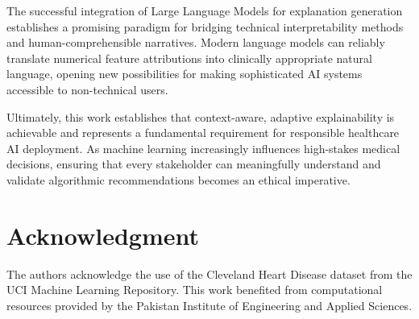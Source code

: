 \documentclass{ieeeaccess}
\begin{document}
The successful integration of Large Language Models for explanation generation establishes a promising paradigm for bridging technical interpretability methods and human-comprehensible narratives. Modern language models can reliably translate numerical feature attributions into clinically appropriate natural language, opening new possibilities for making sophisticated AI systems accessible to non-technical users.

Ultimately, this work establishes that context-aware, adaptive explainability is achievable and represents a fundamental requirement for responsible healthcare AI deployment. As machine learning increasingly influences high-stakes medical decisions, ensuring that every stakeholder can meaningfully understand and validate algorithmic recommendations becomes an ethical imperative.


\section*{Acknowledgment}
The authors acknowledge the use of the Cleveland Heart Disease dataset from the UCI Machine Learning Repository. This work benefited from computational resources provided by the Pakistan Institute of Engineering and Applied Sciences.

\end{document}
